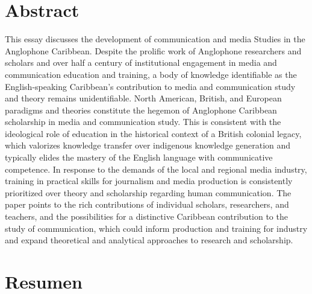 \documentclass{tufte-handout}
\begin{document}
\begin{titlepage}
\vspace*{2em}

\hypertarget{abstract}{%
\section{Abstract}\label{abstract}}

This essay discusses the development of communication and media Studies in the Anglophone Caribbean. Despite the prolific work of Anglophone researchers and scholars and over half a century of institutional engagement in media and communication education and training, a body of knowledge identifiable as the English-speaking Caribbean’s contribution to media and communication study and theory remains unidentifiable. North American, British, and European paradigms and theories constitute the hegemon of Anglophone Caribbean scholarship in media and communication study. This is consistent with the ideological role of education in the historical context of a British colonial legacy, which valorizes knowledge transfer over indigenous knowledge generation and typically elides the mastery of the English language with communicative competence. In response to the demands of the local and regional media industry, training in practical skills for journalism and media production is consistently prioritized over theory and scholarship regarding human communication. The paper points to the rich contributions of individual scholars, researchers, and teachers, and the possibilities for a distinctive Caribbean contribution to the study of communication, which could inform production and training for industry and expand theoretical and analytical approaches to research and scholarship.

\vspace*{2em}


\hypertarget{resumen}{%
\section{Resumen}\label{resumen}}


\end{titlepage}
\end{document}
